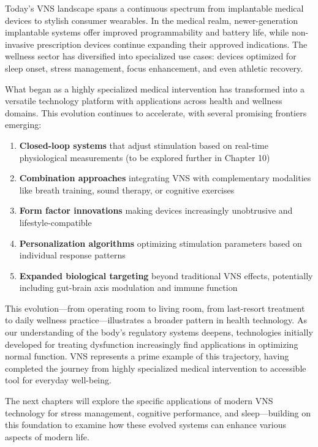 \documentclass[
  Letterpaper,
]{scrbook}
\begin{document}
Today's VNS landscape spans a continuous spectrum from implantable
medical devices to stylish consumer wearables. In the medical realm,
newer-generation implantable systems offer improved programmability and
battery life, while non-invasive prescription devices continue expanding
their approved indications. The wellness sector has diversified into
specialized use cases: devices optimized for sleep onset, stress
management, focus enhancement, and even athletic recovery.

What began as a highly specialized medical intervention has transformed
into a versatile technology platform with applications across health and
wellness domains. This evolution continues to accelerate, with several
promising frontiers emerging:

\begin{enumerate}
\def\labelenumi{\arabic{enumi}.}
\item
  \textbf{Closed-loop systems} that adjust stimulation based on
  real-time physiological measurements (to be explored further in
  Chapter 10)
\item
  \textbf{Combination approaches} integrating VNS with complementary
  modalities like breath training, sound therapy, or cognitive exercises
\item
  \textbf{Form factor innovations} making devices increasingly
  unobtrusive and lifestyle-compatible
\item
  \textbf{Personalization algorithms} optimizing stimulation parameters
  based on individual response patterns
\item
  \textbf{Expanded biological targeting} beyond traditional VNS effects,
  potentially including gut-brain axis modulation and immune function
\end{enumerate}

This evolution---from operating room to living room, from last-resort
treatment to daily wellness practice---illustrates a broader pattern in
health technology. As our understanding of the body's regulatory systems
deepens, technologies initially developed for treating dysfunction
increasingly find applications in optimizing normal function. VNS
represents a prime example of this trajectory, having completed the
journey from highly specialized medical intervention to accessible tool
for everyday well-being.

The next chapters will explore the specific applications of modern VNS
technology for stress management, cognitive performance, and
sleep---building on this foundation to examine how these evolved systems
can enhance various aspects of modern life.
\end{document}
